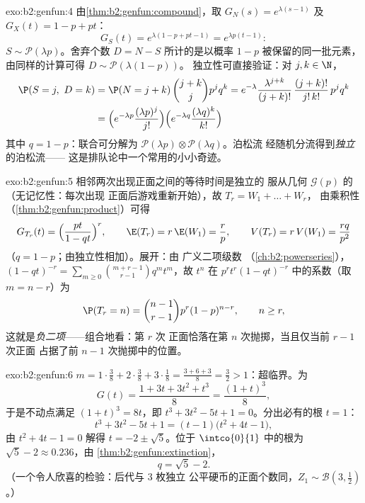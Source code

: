 \begin{solution}{exo:b2:genfun:4}
由\cref{thm:b2:genfun:compound}，取 $G_N(s) = e^{\lambda(s-1)}$
及 $G_X(t) = 1 - p + pt$：
\[
G_S(t) = e^{\lambda(1 - p + pt - 1)} = e^{\lambda p(t - 1)} :
\]
$S \sim \mathcal{P}(\lambda p)$。舍弃个数 $D = N - S$
所计的是以概率 $1 - p$ 被保留的同一批元素，
由同样的计算可得 $D \sim \mathcal{P}(\lambda(1 - p))$。
独立性可直接验证：对 $j, k \in \N$，
\begin{align*}
\P(S = j,\ D = k)
&= \P(N = j + k)\,\binom{j+k}{j}p^jq^k
= e^{-\lambda}\frac{\lambda^{j+k}}{(j+k)!}\,
\frac{(j+k)!}{j!\,k!}\,p^jq^k\\
&= \Bigl(e^{-\lambda p}\frac{(\lambda p)^j}{j!}\Bigr)
\Bigl(e^{-\lambda q}\frac{(\lambda q)^k}{k!}\Bigr)
\end{align*}
其中 $q = 1 - p$：联合可分解为
$\mathcal{P}(\lambda p) \otimes \mathcal{P}(\lambda q)$。泊松流
经随机分流得到\emph{独立}的泊松流——
这是排队论中一个常用的小小奇迹。
\end{solution}

\begin{solution}{exo:b2:genfun:5}
相邻两次出现正面之间的等待时间是独立的
服从几何 $\mathcal{G}(p)$ 的（无记忆性：每次出现
正面后游戏重新开始），故 $T_r = W_1 + \dots + W_r$，
由乘积性（\cref{thm:b2:genfun:product}）可得
\[
G_{T_r}(t) = \Bigl(\frac{pt}{1 - qt}\Bigr)^{r},
\qquad
\E(T_r) = r\,\E(W_1) = \frac rp,
\qquad
V(T_r) = r\,V(W_1) = \frac{rq}{p^2}
\]
（$q = 1 - p$；由独立性相加）。展开：由
广义二项级数
（\cref{ch:b2:powerseries}），$(1 - qt)^{-r} = \sum_{m\geq0}
\binom{m + r - 1}{r - 1}q^mt^m$，故 $t^n$ 在
$p^rt^r(1 - qt)^{-r}$ 中的系数（取 $m = n - r$）为
\[
\P(T_r = n) = \binom{n-1}{r-1}p^r(1-p)^{n-r},
\qquad n \geq r ,
\]
这就是\emph{负二项}——组合地看：第 $r$ 次
正面恰落在第 $n$ 次抛掷，当且仅当前 $r - 1$ 次正面
占据了前 $n - 1$ 次抛掷中的位置。
\end{solution}

\begin{solution}{exo:b2:genfun:6}
$m = 1\cdot\frac38 + 2\cdot\frac38 + 3\cdot\frac18 = \frac{3 + 6 +
3}{8} = \frac32 > 1$：超临界。为
\[
G(t) = \frac{1 + 3t + 3t^2 + t^3}{8} = \frac{(1 + t)^3}{8} ,
\]
于是不动点满足 $(1 + t)^3 = 8t$，即 $t^3 + 3t^2 - 5t + 1
= 0$。分出必有的根 $t = 1$：
\[
t^3 + 3t^2 - 5t + 1 = (t - 1)\bigl(t^2 + 4t - 1\bigr),
\]
由 $t^2 + 4t - 1 = 0$ 解得 $t = -2 \pm \sqrt5$。位于
$\intco{0}{1}$ 中的根为 $\sqrt5 - 2 \approx 0.236$，由
\cref{thm:b2:genfun:extinction}，
\[
q = \sqrt 5 - 2 .
\]
（一个令人欣喜的检验：后代与 $3$ 枚独立
公平硬币的正面个数同，$Z_1 \sim \mathcal{B}(3, \frac12)$。）
\end{solution}

